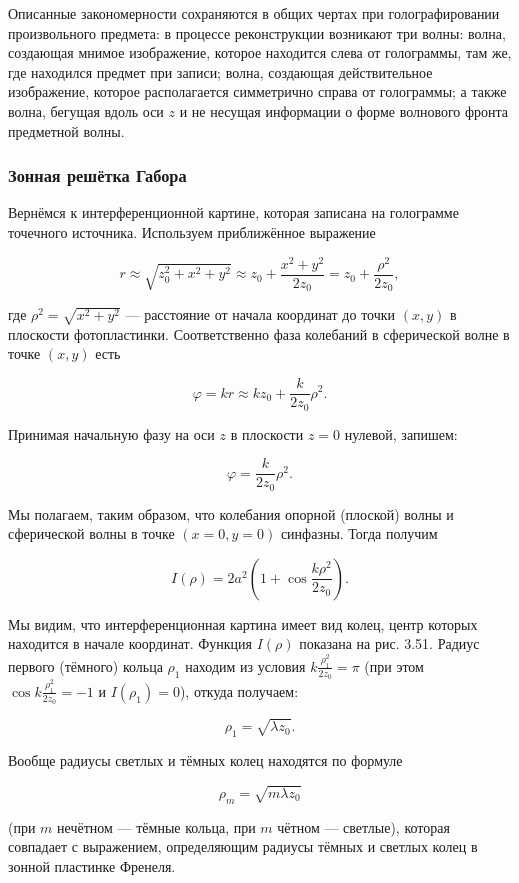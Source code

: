 \documentclass[a4paper,12pt]{article}
\begin{document}
Описанные закономерности сохраняются в общих чертах при голографировании произвольного предмета: в процессе реконструкции возникают три волны: волна, создающая мнимое изображение, которое находится слева от голограммы, там же, где находился предмет при записи; волна, создающая действительное изображение, которое располагается симметрично справа от голограммы; а также волна, бегущая вдоль оси \( z \) и не несущая информации о форме волнового фронта предметной волны.

\subsubsection{Зонная решётка Габора}

Вернёмся к интерференционной картине, которая записана на голограмме точечного источника. Используем приближённое выражение

\[ r \approx \sqrt{z_0^2 + x^2 + y^2} \approx z_0 + \frac{x^2 + y^2}{2z_0} = z_0 + \frac{\rho^2}{2z_0}, \]

где \( \rho^2 = \sqrt{x^2 + y^2} \) — расстояние от начала координат до точки \((x,y)\) в плоскости фотопластинки. Соответственно фаза колебаний в сферической волне в точке \( (x,y) \) есть

\[ \varphi = kr \approx kz_0 + \frac{k}{2z_0} \rho^2. \]

Принимая начальную фазу на оси \( z \) в плоскости \( z = 0 \) нулевой, запишем:

\[ \varphi = \frac{k}{2z_0} \rho^2. \]

Мы полагаем, таким образом, что колебания опорной (плоской) волны и сферической волны в точке \( (x = 0, y = 0) \) синфазны. Тогда получим

\[ I(\rho) = 2a^2 \left( 1 + \cos \frac{k\rho^2}{2z_0} \right). \]

Мы видим, что интерференционная картина имеет вид колец, центр которых находится в начале координат. Функция \( I(\rho) \) показана на рис. 3.51. Радиус первого (тёмного) кольца \( \rho_1 \) находим из условия \( k\frac{\rho_1^2}{2z_0} = \pi \) (при этом \( \cos k\frac{\rho_1^2}{2z_0} = -1 \) и \( I(\rho_1) = 0 \)), откуда получаем:

\[ \rho_1 = \sqrt{\lambda z_0}. \]

Вообще радиусы светлых и тёмных колец находятся по формуле

\[ \rho_m = \sqrt{m\lambda z_0} \]

(при \( m \) нечётном — тёмные кольца, при \( m \) чётном — светлые), которая совпадает с выражением, определяющим радиусы тёмных и светлых колец в зонной пластинке Френеля.
\end{document}
